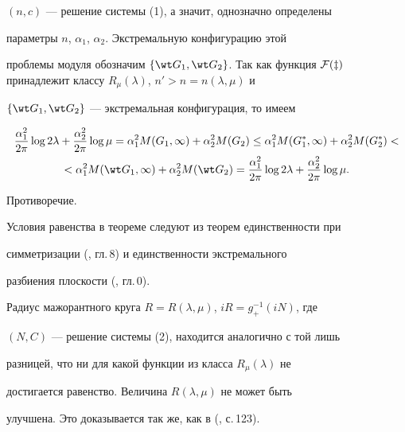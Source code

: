 \begin{pf}
$(n,c)$ --- решение системы (1), а значит, однозначно определены 


параметры $n$, $\alpha_1$, $\alpha_2$. Экстремальную конфигурацию этой 


проблемы модуля обозначим $\{\wt G_1,\wt G_2\}$. Так как функция $\cal 


F(z)$ принадлежит классу $R_\mu(\lambda)$, $n'>n=n(\lambda,\mu)$ и 


$\{\wt G_1,\wt G_2\}$ --- экстремальная конфигурация, то имеем 


\begin{multline*} 


\frac{\alpha^2_1}{2\pi}\log2\lambda+\frac{\alpha^2_2}{2\pi}\log\mu= 


\alpha^2_1M(G_1,\infty)+\alpha^2_2M(G_2)\le 


\alpha^2_1M(G^*_1,\infty)+\alpha^2_2M(G^*_2)< \\ 


% 


<\alpha^2_1M(\wt G_1,\infty)+\alpha^2_2M(\wt G_2)= 


\frac{\alpha^2_1}{2\pi}\log2\lambda+ 


\frac{\alpha^2_2}{2\pi}\log\mu. 


\end{multline*} 


Противоречие. 


 


Условия равенства в теореме следуют из теорем единственности при 


симметризации (\cite{1}, гл.\,8) и единственности экстремального 


разбиения плоскости (\cite{2}, гл.\,0). 


 


Радиус мажорантного круга $R=R(\lambda,\mu)$, $iR=g^{-1}_+(iN)$, где 


$(N,C)$ --- решение системы (2), находится аналогично с той лишь 


разницей, что ни для какой функции из класса $R_\mu(\lambda)$ не 


достигается равенство. Величина $R(\lambda,\mu)$ не может быть 


улучшена. Это доказывается так же, как в (\cite{3}, с.\,123).


\end{pf} 


 



